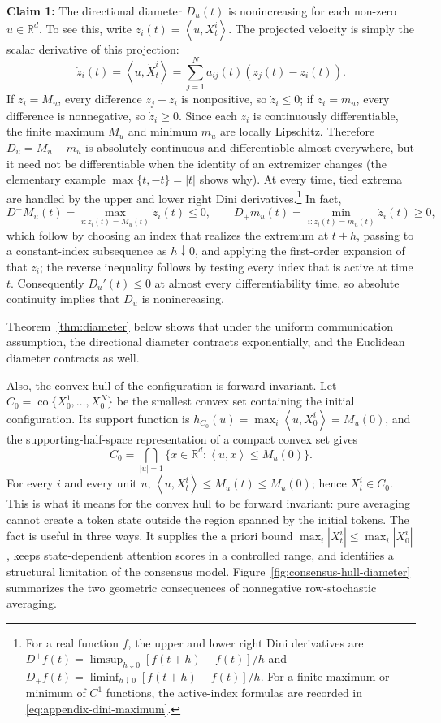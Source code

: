 \documentclass[11pt]{amsart}
\numberwithin{equation}{section}
\theoremstyle{plain}
\newcommand{\R}{\mathbb{R}}
\newcommand{\ip}[2]{\left\langle#1,#2\right\rangle}
\begin{document}
\textbf{Claim 1:} The directional diameter $D_u(t)$ is nonincreasing for each non-zero $u\in \R^d$. To see this, write $z_i(t)=\ip{u}{X_t^i}$.  The projected velocity is simply the scalar derivative of this projection:
\begin{equation}\label{eq:projected-velocity}
 \dot z_i(t)=\ip{u}{\dot X_t^i}
 =\sum_{j=1}^Na_{ij}(t)(z_j(t)-z_i(t)).
\end{equation}
If $z_i=M_u$, every difference $z_j-z_i$ is nonpositive, so
$\dot z_i\leq0$; if $z_i=m_u$, every difference is nonnegative, so
$\dot z_i\geq0$.  Since each $z_i$ is continuously differentiable,
the finite maximum $M_u$ and minimum $m_u$ are locally Lipschitz.  Therefore
$D_u=M_u-m_u$ is absolutely continuous and differentiable almost everywhere,
but it need not be differentiable when the identity of an extremizer changes
(the elementary example $\max\{t,-t\}=|t|$ shows why).  At every time, tied
extrema are handled by the upper and lower right Dini derivatives.\footnote{For
a real function $f$, the upper and lower right Dini derivatives are
$D^+f(t)=\limsup_{h\downarrow0}[f(t+h)-f(t)]/h$ and
$D_+f(t)=\liminf_{h\downarrow0}[f(t+h)-f(t)]/h$.  For a finite maximum or
minimum of $C^1$ functions, the active-index formulas are recorded in
\eqref{eq:appendix-dini-maximum}.} In fact,
\[
 D^+M_u(t)=\max_{i:z_i(t)=M_u(t)}\dot z_i(t)\leq0,
 \qquad
 D_+m_u(t)=\min_{i:z_i(t)=m_u(t)}\dot z_i(t)\geq0,
\]
which follow by choosing an index that realizes the extremum at $t+h$, passing
to a constant-index subsequence as $h\downarrow0$, and applying the first-order
expansion of that $z_i$; the reverse inequality follows by testing every index
that is active at time $t$.
Consequently $D_u'(t)\leq0$ at almost every differentiability time, so
absolute continuity implies that $D_u$ is nonincreasing.

Theorem~\ref{thm:diameter} below shows that under the uniform communication assumption, the directional diameter contracts exponentially, and the Euclidean diameter contracts as well.

Also, the convex hull of the configuration is forward invariant.
Let
$C_0=\operatorname{co}\{X_0^1,\ldots,X_0^N\}$ be the smallest convex set
containing the initial configuration.  Its support function is
$h_{C_0}(u)=\max_i\ip{u}{X_0^i}=M_u(0)$, and the supporting-half-space
representation of a compact convex set gives
\[
 C_0=\bigcap_{|u|=1}\{x\in\R^d:\ip{u}{x}\leq M_u(0)\}.
\]
For every $i$ and every unit $u$,
$\ip{u}{X_t^i}\leq M_u(t)\leq M_u(0)$; hence $X_t^i\in C_0$.  This is what it
means for the convex hull to be forward invariant: pure averaging cannot
create a token state outside the region spanned by the initial tokens.  The
fact is useful in three ways.  It supplies the a priori bound
$\max_i|X_t^i|\leq\max_i|X_0^i|$, keeps state-dependent attention scores in a
controlled range, and identifies a structural limitation of the consensus
model. Figure~\ref{fig:consensus-hull-diameter} summarizes the two geometric
consequences of nonnegative row-stochastic averaging.
\end{document}
